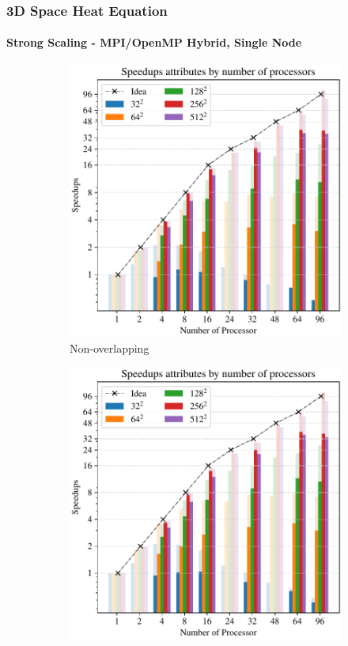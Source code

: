 \begin{frame}
  \frametitle{3D Space Heat Equation}
  \framesubtitle{Strong Scaling - MPI/OpenMP Hybrid, Single Node}



  \begin{figure}
    \centering
    \begin{subfigure}{0.42\textwidth}
      \centering
      \includegraphics[width=\textwidth]{figure/FIG_Benchmark_hybrid_0_single_nodes_3D.pdf}
      \caption{Non-overlapping}
      \label{FIG:Benchmark:FIG_Benchmark_hybrid_0_single_nodes_3D}      
    \end{subfigure}
    \begin{subfigure}{0.42\textwidth}
      \centering
      \includegraphics[width=\textwidth]{figure/FIG_Benchmark_hybrid_1_single_nodes_3D.pdf}

\end{subfigure}
\end{figure}
\end{frame}
